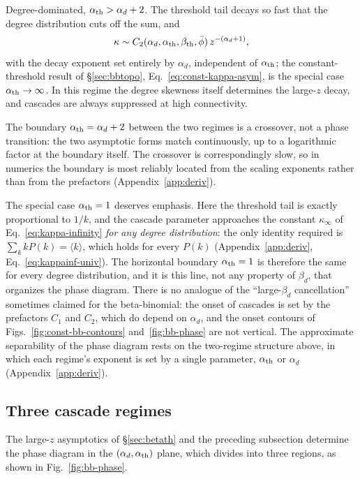 \documentclass[]{revtex4-2}
\begin{document}
Degree-dominated, $\alpha_{\rm th}>\alpha_d+2$. The threshold tail decays so fast that the degree distribution cuts off the sum, and\begin{equation}
    \kappa \sim C_2(\alpha_d,\alpha_{\rm th},\beta_{\rm th},\bar\phi)\,
    z^{-(\alpha_d+1)},
    \label{eq:C2}
\end{equation}
with the decay exponent set entirely by $\alpha_d$, independent of $\alpha_{\rm th}$; the constant-threshold result of \S\ref{sec:bbtopo}, Eq.~\eqref{eq:const-kappa-asym}, is the special case $\alpha_{\rm th}\to\infty$. In this regime the degree skewness itself determines the large-$z$ decay, and cascades are always suppressed at high connectivity.

The boundary $\alpha_{\rm th}=\alpha_d+2$ between the two regimes is a crossover, not a phase transition: the two asymptotic forms match continuously, up to a logarithmic factor at the boundary itself. The crossover is correspondingly slow, so in numerics the boundary is most reliably located from the scaling exponents rather than from the prefactors (Appendix~\ref{app:deriv}).

The special case $\alpha_{\rm th}=1$ deserves emphasis. Here the threshold tail is exactly proportional to $1/k$, and the cascade parameter approaches the constant $\kappa_\infty$ of Eq.~\eqref{eq:kappa-infinity} \emph{for any degree distribution}: the only identity required is $\sum_k k P(k)=\langle k\rangle$, which holds for every $P(k)$ (Appendix~\ref{app:deriv}, Eq.~\eqref{eq:kappainf-univ}). The horizontal boundary $\alpha_{\rm th}=1$ is therefore the same for every degree distribution, and it is this line, not any property of $\beta_d$, that organizes the phase diagram. There is no analogue of the ``large-$\beta_d$ cancellation'' sometimes claimed for the beta-binomial: the onset of cascades is set by the prefactors $C_1$ and $C_2$, which do depend on $\alpha_d$, and the onset contours of Figs.~\ref{fig:const-bb-contours} and~\ref{fig:bb-phase} are not vertical. The approximate separability of the phase diagram rests on the two-regime structure above, in which each regime's exponent is set by a single parameter, $\alpha_{\rm th}$ or $\alpha_d$ (Appendix~\ref{app:deriv}).

\subsection{Three cascade regimes}

The large-$z$ asymptotics of \S\ref{sec:betath} and the preceding subsection determine the phase diagram in the $(\alpha_d,\alpha_{\rm th})$ plane, which divides into three regions, as shown in Fig.~\ref{fig:bb-phase}.
\end{document}
